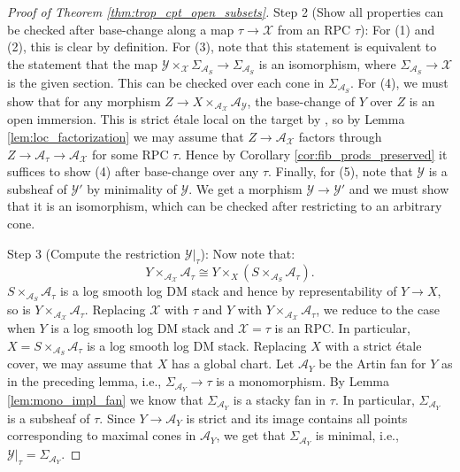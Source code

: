 \documentclass[11pt]{amsart}
\theoremstyle{definition}
\theoremstyle{remark}
\begin{document}
\begin{proof}[Proof of Theorem \ref{thm:trop_cpt_open_subsets}]
	Step 2 (Show all properties can be checked after base-change along a map $\tau\to \mathcal{X}$ from an RPC $\tau$):
	For (1) and (2), this is clear by definition. For (3), note that
	this statement is equivalent to the statement that the map
	$\mathcal{Y}\times_{\mathcal{X}}\Sigma_{\mathcal{A}_S}\to \Sigma_{\mathcal{A}_S}$ is an
	isomorphism, where
	$\Sigma_{\mathcal{A}_S}\to \mathcal{X}$ is the given section. This can be checked over
	each cone in $\Sigma_{\mathcal{A}_S}$. For (4),
	we must show that for any morphism $Z\to X\times_{\mathcal{A}_{\mathcal{X}}}\mathcal{A}_{\mathcal{Y}}$,
	the base-change of $Y$ over $Z$ is an open immersion. This is strict étale local on the target by
	\cite[Tag 02L3]{stacks-project}, so by Lemma \ref{lem:loc_factorization} we may assume that $Z\to \mathcal{A}_{\mathcal{X}}$
	factors through $Z\to \mathcal{A}_{\tau}\to \mathcal{A}_{\mathcal{X}}$ for some RPC $\tau$. Hence by
	Corollary \ref{cor:fib_prods_preserved} it suffices to show (4) after base-change over any $\tau$.
	Finally, for (5), note that $\mathcal{Y}$ is a subsheaf of $\mathcal{Y}'$ by minimality of $\mathcal{Y}$. We get
	a morphism $\mathcal{Y}\to \mathcal{Y}'$ and we must show that it is an isomorphism, which can be checked
	after restricting to an arbitrary cone.

	Step 3 (Compute the restriction $\mathcal{Y}|_{\tau}$): Now note that:
	$$Y\times_{\mathcal{A}_{\mathcal{X}}}\mathcal{A}_{\tau}\cong Y\times_{X}(S\times_{\mathcal{A}_S}\mathcal{A}_{\tau}).$$
	$S\times_{\mathcal{A}_S}\mathcal{A}_{\tau}$ is a
	log smooth log DM stack
	and hence by representability of $Y\to X$, so is $Y\times_{\mathcal{A}_{\mathcal{X}}}\mathcal{A}_{\tau}$.
	Replacing $\mathcal{X}$ with $\tau$ and $Y$ with $Y\times_{\mathcal{A}_{\mathcal{X}}}\mathcal{A}_{\tau}$,
	we reduce to the case when $Y$ is a log smooth log DM stack and $\mathcal{X}=\tau$ is an RPC. In particular,
	$X=S\times_{\mathcal{A}_S}\mathcal{A}_{\tau}$ is a log smooth log DM stack. Replacing $X$
	with a strict étale cover, we may assume that $X$ has a global chart. Let $\mathcal{A}_{Y}$
	be the Artin fan for $Y$ as in the preceding lemma, i.e., $\Sigma_{\mathcal{A}_Y}\to \tau$ is a monomorphism.
	By Lemma \ref{lem:mono_impl_fan} we know that $\Sigma_{\mathcal{A}_Y}$ is a stacky fan in $\tau$.
	In particular, $\Sigma_{\mathcal{A}_Y}$ is a subsheaf of $\tau$. Since $Y\to \mathcal{A}_Y$ is strict and its image contains all
	points corresponding to maximal cones in $\mathcal{A}_Y$, we get that $\Sigma_{\mathcal{A}_Y}$ is minimal,
	i.e., $\mathcal{Y}|_{\tau}=\Sigma_{\mathcal{A}_Y}$.


\end{proof}
\end{document}
